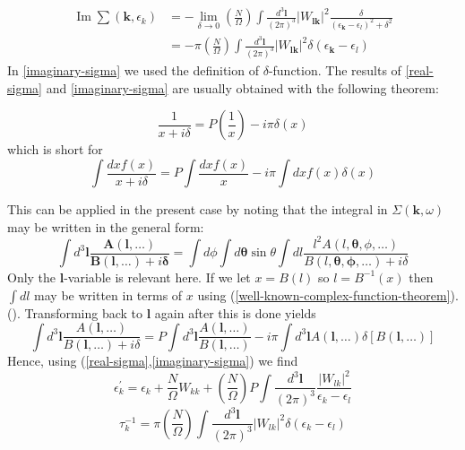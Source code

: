\begin{equation}\begin{aligned}
\operatorname{Im} \sum\left(\mathbf{k}, \epsilon_{k}\right) &=-\lim _{\delta \rightarrow 0}\left(\frac{N}{\Omega}\right) \int \frac{d^{3} \mathbf{l}}{(2 \pi)^{3}}\left|W_{\mathbf{lk}}\right|^{2} \frac{\delta}{\left(\epsilon_{\mathbf{k}}-\epsilon_{l}\right)^{2}+\delta^{2}} \\
&=-\pi\left(\frac{N}{\Omega}\right) \int \frac{d^{3} \mathbf{l}}{(2 \pi)^{3}}\left|W_{\mathbf{lk}}\right|^{2} \delta\left(\epsilon_{\mathbf{k}}-\epsilon_{l}\right)
\end{aligned}\end{equation}
In \ref{imaginary-sigma} we used the  definition of $\delta$-function. The results of \ref{real-sigma} and \ref{imaginary-sigma} are usually obtained with the following theorem:
\begin{imp}
\begin{equation}\frac{1}{x+i \delta}=P (\frac{1}{x})-i \pi \delta(x)\end{equation}
which is short for 
\begin{equation}\int \frac{d x f(x)}{x+i \delta}=P \int \frac{d x f(x)}{x}-i \pi \int d x f(x) \delta(x)
\label{well-known-complex-function-theorem}
\end{equation}
\end{imp}
This can be applied in the present case by noting that the integral in $\Sigma(\mathbf{k},\omega)$ may be written in the general form:
\begin{equation}\int d^{3} \mathbf{l} \frac{\boldsymbol{A}(\mathbf{l}, \ldots)}{\boldsymbol{B}(\mathbf{l}, \ldots)+i \boldsymbol{\delta}}=\int d \phi \int d \boldsymbol{\theta} \sin \theta \int d l  \frac{l^{2}A(l, \boldsymbol{\theta}, \phi, \ldots)}{B(l, \boldsymbol{\theta}, \boldsymbol{\phi}, \ldots)+i \delta}\end{equation}
Only the $\mathbf{l}$-variable is relevant here. If we let $x=B(l)$ so $l=B^{-1}(x)$ then $\int d l$ may be written in terms of $x$ using (\ref{well-known-complex-function-theorem}).(). Transforming back to $\mathbf{l}$ again after this is done yields
$$\int d^{3} \mathbf{l} \frac{A(\mathbf{l}, \ldots)}{B(\mathbf{l}, \ldots)+i \delta}=P \int d^{3} \mathbf{l} \frac{A(\mathbf{l}, \ldots)}{B(\mathbf{l}, \ldots)}-i \pi \int d^{3} \mathbf{l} A(\mathbf{l}, \ldots) \delta[B(\mathbf{l}, \ldots)]$$
Hence, using (\ref{real-sigma},\ref{imaginary-sigma}) we find
\begin{equation}\epsilon_{k}^{\prime}=\epsilon_{k}+\frac{N}{\Omega} W_{k k}+\left(\frac{N}{\Omega}\right) P \int \frac{d^{3} \mathbf{l}}{(2 \pi)^{3}} \frac{\left|W_{l k}\right|^{2}}{\epsilon_{k}-\epsilon_{l}}\end{equation}
\begin{equation}\tau_{k}^{-1}=\pi\left(\frac{N}{\Omega}\right) \int \frac{d^{3} \mathbf{l}}{(2 \pi)^{3}}\left|W_{l k}\right|^{2} \delta\left(\epsilon_{k}-\epsilon_{l}\right)\end{equation}